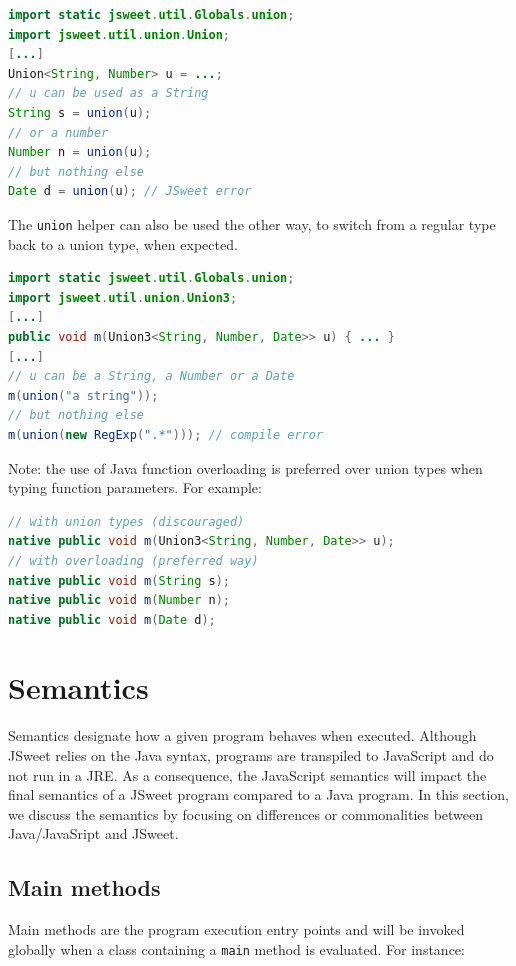 \documentclass[a4paper]{report}
\begin{document}
\begin{lstlisting}[language=Java]
import static jsweet.util.Globals.union;
import jsweet.util.union.Union;
[...]
Union<String, Number> u = ...;
// u can be used as a String
String s = union(u);
// or a number
Number n = union(u);
// but nothing else
Date d = union(u); // JSweet error
\end{lstlisting}

The \texttt{union} helper can also be used the other way, to switch from a regular type back to a union type, when expected.

\begin{lstlisting}[language=Java]
import static jsweet.util.Globals.union;
import jsweet.util.union.Union3;
[...]
public void m(Union3<String, Number, Date>> u) { ... }
[...]
// u can be a String, a Number or a Date
m(union("a string"));
// but nothing else
m(union(new RegExp(".*"))); // compile error
\end{lstlisting}

Note: the use of Java function overloading is preferred over union types when typing function parameters. For example:

\begin{lstlisting}[language=Java]
// with union types (discouraged)
native public void m(Union3<String, Number, Date>> u);
// with overloading (preferred way)
native public void m(String s);
native public void m(Number n);
native public void m(Date d);
\end{lstlisting}

\chapter{Semantics}
\label{semantics}

Semantics designate how a given program behaves when executed. Although JSweet relies on the Java syntax, programs are transpiled to JavaScript and do not run in a JRE. As a consequence, the JavaScript semantics will impact the final semantics of a JSweet program compared to a Java program. In this section, we discuss the semantics by focusing on differences or commonalities between Java/JavaSript and JSweet.

\section{Main methods}

Main methods are the program execution entry points and will be invoked globally when a class containing a \texttt{main} method is evaluated. For instance:
\end{document}
